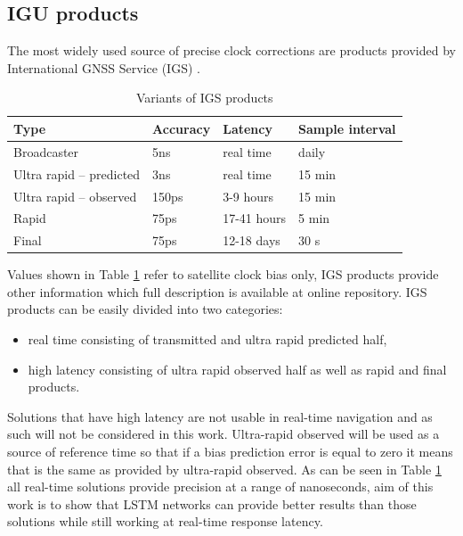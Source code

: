 \documentclass{article}
\begin{document}
\subsection{IGU products}
The most widely used source of precise clock corrections are products provided 
by International GNSS Service (IGS) \cite{Kouba2009}.
\begin{table}[htb] 
	\centering
	\caption{Variants of IGS products}
	\label{tab:igs_products}
	\begin{tabular*}{\textwidth}{*{4}{l}}
		\hline
		\hline
		Type& Accuracy& Latency& Sample interval \\
		\hline
		Broadcaster & 5ns & real time &  daily  \\
		Ultra rapid -- predicted & 3ns & real time & 15 min  \\
		Ultra rapid -- observed & 150ps & 3-9 hours & 15 min  \\
		Rapid & 75ps & 17-41 hours & 5 min \\
		Final & 75ps & 12-18 days & 30 s \\
		\hline
		\hline
	\end{tabular*}
\end{table}
Values shown in Table \ref{tab:igs_products} refer to satellite clock bias only,  IGS products
provide other information which full description  is available at online repository. 
IGS products can be easily divided into two categories:
\begin{itemize}
	\item real time consisting of transmitted and ultra rapid predicted half,
	\item high latency consisting of ultra rapid observed half as well as rapid and final products.
\end{itemize}
Solutions that have high latency are not usable in real-time navigation and as such will not be
considered in this work. Ultra-rapid observed will be used as a source of
reference time so that if a bias prediction error is equal to zero it means that is
the same as provided by ultra-rapid observed.
As can be seen in Table \ref{tab:igs_products} all real-time solutions provide precision 
at a range of nanoseconds, aim of this work is to show that LSTM networks can provide 
better results than those solutions while still working at real-time response latency.

\end{document}
